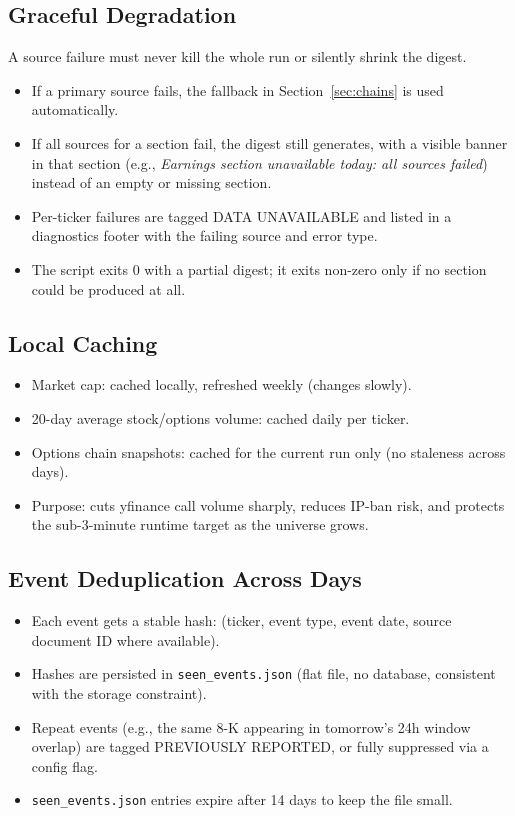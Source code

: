 \documentclass[11pt]{article}
\begin{document}
\subsection{Graceful Degradation}
A source failure must never kill the whole run or silently shrink the digest.
\begin{itemize}
  \item If a primary source fails, the fallback in Section~\ref{sec:chains} is used automatically.
  \item If all sources for a section fail, the digest still generates, with a visible banner in that section (e.g., \textit{Earnings section unavailable today: all sources failed}) instead of an empty or missing section.
  \item Per-ticker failures are tagged DATA UNAVAILABLE and listed in a diagnostics footer with the failing source and error type.
  \item The script exits 0 with a partial digest; it exits non-zero only if no section could be produced at all.
\end{itemize}

\subsection{Local Caching}
\begin{itemize}
  \item Market cap: cached locally, refreshed weekly (changes slowly).
  \item 20-day average stock/options volume: cached daily per ticker.
  \item Options chain snapshots: cached for the current run only (no staleness across days).
  \item Purpose: cuts yfinance call volume sharply, reduces IP-ban risk, and protects the sub-3-minute runtime target as the universe grows.
\end{itemize}

\subsection{Event Deduplication Across Days}
\begin{itemize}
  \item Each event gets a stable hash: (ticker, event type, event date, source document ID where available).
  \item Hashes are persisted in \texttt{seen\_events.json} (flat file, no database, consistent with the storage constraint).
  \item Repeat events (e.g., the same 8-K appearing in tomorrow's 24h window overlap) are tagged PREVIOUSLY REPORTED, or fully suppressed via a config flag.
  \item \texttt{seen\_events.json} entries expire after 14 days to keep the file small.
\end{itemize}
\end{document}
